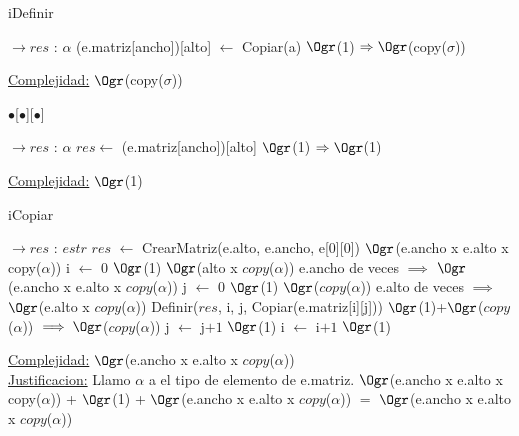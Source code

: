 \begin{Representacion}
\begin{Algoritmos}
\begin{algorithm}[H]
	\end{algorithm}
	
	\begin{algorithm}[H]
		\caption{iDefinir}
		
		\begin{algorithmic}[1]
			 $\to res$ : $\alpha$
			\State (e.matriz[ancho])[alto] $\leftarrow$ Copiar(a) \Comment $\Ogr$(1) $\Rightarrow \Ogr$(copy($\sigma$))
			\EndProcedure
		\end{algorithmic}
		\underline{Complejidad:} $\Ogr$(copy($\sigma$))
		
	\end{algorithm}
	
	\begin{algorithm}[H]
		\caption{$\bullet$[$\bullet$][$\bullet$]}
		
		\begin{algorithmic}[1]
			 $\to res$ : $\alpha$
			\State $res \leftarrow$ (e.matriz[ancho])[alto] \Comment $\Ogr$(1) $\Rightarrow \Ogr$(1)
			\EndProcedure
		\end{algorithmic}
		\underline{Complejidad:} $\Ogr$(1)
		
	\end{algorithm}
	
	\begin{algorithm}[H]
		\caption{iCopiar}
		
		\begin{algorithmic}[1]
			 $\to res$ : $estr$
			\State $res$ $\leftarrow$ CrearMatriz(e.alto, e.ancho, e[0][0]) \Comment $\Ogr$(e.ancho x e.alto x copy($\alpha$))
			\State i $\leftarrow$ $0$ \Comment $\Ogr$(1)
			 \Comment $\Ogr$(alto x $copy$($\alpha$)) e.ancho de veces $\implies$ $\Ogr$(e.ancho x e.alto x $copy$($\alpha$))
				\State j $\leftarrow$ $0$ \Comment $\Ogr$(1)
				 \Comment $\Ogr$($copy$($\alpha$)) e.alto de veces $\implies$  $\Ogr$(e.alto x $copy$($\alpha$))
					\State Definir($res$, i, j, Copiar(e.matriz[i][j])) \Comment $\Ogr$(1)+$\Ogr$($copy$($\alpha$)) $\implies \Ogr$($copy$($\alpha$))
					\State j $\leftarrow$ j$+1$ \Comment $\Ogr$(1)
				\EndWhile
				\State i $\leftarrow$ i$+1$ \Comment $\Ogr$(1)
			\EndWhile
			\EndProcedure
		\end{algorithmic}
		\underline{Complejidad:} $\Ogr$(e.ancho x e.alto x $copy$($\alpha$))
		\\
		\underline{Justificacion:} Llamo $\alpha$ a el tipo de elemento de e.matriz. $\Ogr$(e.ancho x e.alto x copy($\alpha$)) + $\Ogr$(1) + $\Ogr$(e.ancho x e.alto x $copy$($\alpha$)) $=$ $\Ogr$(e.ancho x e.alto x $copy$($\alpha$))
		

\end{algorithm}
\end{Algoritmos}
\end{Representacion}
